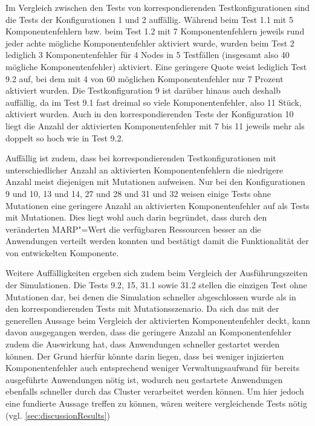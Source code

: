 Im Vergleich zwischen den Tests von korrespondierenden Testkonfigurationen sind die Tests der Konfigurationen 1 und 2 auffällig.
Während beim Test 1.1 mit 5 Komponentenfehlern bzw. beim Test 1.2 mit 7 Komponentenfehlern jeweils rund jeder achte mögliche Komponentenfehler aktiviert wurde, wurden beim Test 2 lediglich 3 Komponentenfehler für 4 Nodes in 5 Testfällen (insgesamt also 40 mögliche Komponentenfehler) aktiviert.
Eine geringere Quote weist lediglich Test 9.2 auf, bei dem mit 4 von 60 möglichen Komponentenfehler nur 7 Prozent aktiviert wurden.
Die Testkonfiguration 9 ist darüber hinaus auch deshalb auffällig, da im Test 9.1 fast dreimal so viele Komponentenfehler, also 11 Stück, aktiviert wurden.
Auch in den korrespondierenden Tests der Konfiguration 10 liegt die Anzahl der aktivierten Komponentenfehler mit 7 bis 11 jeweils mehr als doppelt so hoch wie in Test 9.2.

Auffällig ist zudem, dass bei korrespondierenden Testkonfigurationen mit unterschiedlicher Anzahl an aktivierten Komponentenfehlern die niedrigere Anzahl meist diejenigen mit Mutationen aufweisen.
Nur bei den Konfigurationen 9 und 10, 13 und 14, 27 und 28 und 31 und 32 weisen einige Tests ohne Mutationen eine geringere Anzahl an aktivierten Komponentenfehler auf als Tests mit Mutationen.
Dies liegt wohl auch darin begründet, dass durch den veränderten \gls{MARP}"=Wert die verfügbaren Ressourcen besser an die Anwendungen verteilt werden konnten und bestätigt damit die Funktionalität der von \citeauthor{Zhang2016} entwickelten Komponente.

Weitere Auffälligkeiten ergeben sich zudem beim Vergleich der Ausführungszeiten der Simulationen.
Die Tests 9.2, 15, 31.1 sowie 31.2 stellen die einzigen Test ohne Mutationen dar, bei denen die Simulation schneller abgeschlossen wurde als in den korrespondierenden Tests mit Mutationsszenario.
Da sich das mit der generellen Aussage beim Vergleich der aktivierten Komponentenfehler deckt, kann davon ausgegangen werden, dass die geringere Anzahl an Komponentenfehler zudem die Auswirkung hat, dass Anwendungen schneller gestartet werden können.
Der Grund hierfür könnte darin liegen, dass bei weniger injizierten Komponentenfehler auch entsprechend weniger Verwaltungsaufwand für bereits ausgeführte Anwendungen nötig ist, wodurch neu gestartete Anwendungen ebenfalls schneller durch das Cluster verarbeitet werden können.
Um hier jedoch eine fundierte Aussage treffen zu können, wären weitere vergleichende Tests nötig (vgl. \cref{sec:discussionResults})

